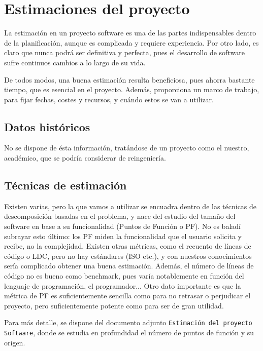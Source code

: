\documentclass[spanish,a4paper,12pt]{report}	%
\begin{document}
\newpage
\mbox{}
\thispagestyle{empty}						%
\newpage
\setcounter{section}{0}

\chapter{Estimaciones del proyecto}

La estimación en un proyecto software es una de las partes indispensables dentro de la planificación, aunque es complicada y requiere experiencia. Por otro lado, es claro que nunca podrá ser definitiva y perfecta, pues el desarrollo de software sufre continuos cambios a lo largo de su vida. 

De todos modos, una buena estimación resulta beneficiosa, pues ahorra bastante tiempo, que es esencial en el proyecto. Además, proporciona un marco de trabajo, para fijar fechas, costes y recursos, y cuándo estos se van a utilizar.

	\section{Datos históricos}
	No se dispone de ésta información, tratándose de un proyecto como el nuestro, académico, que se podría considerar de reingeniería. 

	\section{Técnicas de estimación}
	Existen varias, pero la que vamos a utilizar se encuadra dentro de las técnicas de descomposición basadas en el problema, y nace del estudio del tamaño del software en base a su funcionalidad (Puntos de Función o PF). No es baladí subrayar esto último: los PF miden la funcionalidad que el usuario solicita y recibe, no la complejidad. Existen otras métricas, como el recuento de líneas de código o LDC, pero no hay estándares (ISO etc.), y con nuestros conocimientos sería complicado obtener una buena estimación. Además, el número de líneas de código no es bueno como benchmark, pues varía notablemente en función del lenguaje de programación, el programador... Otro dato importante es que la métrica de PF es suficientemente sencilla como para no retrasar o perjudicar el proyecto, pero suficientemente potente como para ser de gran utilidad.


	Para más detalle, se dispone del documento adjunto \texttt{Estimación del proyecto Software}, donde se estudia en profundidad el número de puntos de función y su origen.
\end{document}
